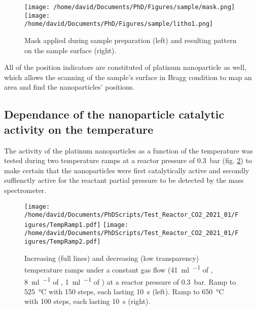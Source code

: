 \begin{figure}[!htb]
    \centering
    \texttt{[image: /home/david/Documents/PhD/Figures/sample/mask.png]}
    \texttt{[image: /home/david/Documents/PhD/Figures/sample/litho1.png]}
    \caption{
    	Mask applied during sample preparation (left) and resulting pattern on the sample surface (right).
    }
    \label{fig:Mask}
\end{figure}

All of the position indicators are constituted of platinum nanoparticle as well, which allows the scanning of the sample's surface in Bragg condition to map an area and find the nanoparticles' positions.

\subsection{Dependance of the nanoparticle catalytic activity on the temperature}

The activity of the platinum nanoparticles as a function of the temperature was tested during two temperature ramps at a reactor pressure of \qty{0.3}{\bar} (fig. \ref{fig:TempRamps}) to make certain that the nanoparticles were first catalytically active and secondly suffienctly active for the reactant partial pressure to be detected by the mass spectrometer.

\begin{figure}[!htb]
    \centering
    \texttt{[image: /home/david/Documents/PhDScripts/Test\_Reactor\_CO2\_2021\_01/Figures/TempRamp1.pdf]}
    \texttt{[image: /home/david/Documents/PhDScripts/Test\_Reactor\_CO2\_2021\_01/Figures/TempRamp2.pdf]}
    \caption{
    	Increasing (full lines) and decreasing (low transparency) temperature ramps under a constant gas flow (\qty{41}{\ml\per\min} of \argon, \qty{8}{\ml\per\min} of \dioxygen, \qty{1}{\ml\per\min} of \ammonia) at a reactor pressure of \qty{0.3}{\bar}.
    	Ramp to \qty{525}{\degreeCelsius} with 150 steps, each lasting \qty{10}{\second} (left).
    	Ramp to \qty{650}{\degreeCelsius} with 100 steps, each lasting \qty{10}{\second} (right).
    }
    \label{fig:TempRamps}
\end{figure}



\subsection{}